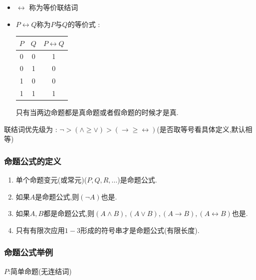 \documentclass[UTF8,12pt]{ctexbook}
\begin{document}
{{{{{\begin{itemize}
{            只考虑形式逻辑不考虑内在联系,因此有局限性,有时候会得到一些奇怪且显然错误的结论.

            可以把它当成$\leq$(?)
            }
      \item $\leftrightarrow$ 称为等价联结词
      \item {
            $P \longleftrightarrow Q$称为$P$与$Q$的等价式 :

            \begin{center}
              \begin{tabular}{c|c|c}
                \hline
                $P$ & $Q$ & $P \longleftrightarrow Q$ \\
                \hline
                0   & 0   & 1                         \\
                0   & 1   & 0                         \\
                1   & 0   & 0                         \\
                1   & 1   & 1                         \\
                \hline
              \end{tabular}
            \end{center}

            只有当两边命题都是真命题或者假命题的时候才是真.
            }
    \end{itemize}

    联结词优先级为 : $\lnot > (\land \geq \lor) > (\to \geq \longleftrightarrow)$(是否取等号看具体定义,默认相等)
  }%

  \subsubsection{命题公式的定义}{
    \begin{enumerate}
      \item 单个命题变元(或常元)($P,Q,R,...$)是命题公式.
      \item 如果$A$是命题公式,则$(\lnot A)$也是.
      \item 如果$A,B$都是命题公式,则$(A \land B),(A \lor B),(A \to B),(A \longleftrightarrow B)$也是.
      \item 只有有限次应用$1 - 3$形成的符号串才是命题公式(有限长度).
    \end{enumerate}
  }%

  \subsubsection{命题公式举例}{
    $P$:简单命题(无连结词)

}}}}}
\end{document}
